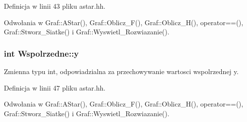 \-Definicja w linii 43 pliku astar.\-hh.



\-Odwołania w \-Graf\-::\-A\-Star(), \-Graf\-::\-Oblicz\-\_\-\-F(), \-Graf\-::\-Oblicz\-\_\-\-H(), operator==(), \-Graf\-::\-Stworz\-\_\-\-Siatke() i \-Graf\-::\-Wyswietl\-\_\-\-Rozwiazanie().

\hypertarget{struct_wspolrzedne_a0c7f103c4e9929641316706fea318d1d}{
\subsubsection[{y}]{\setlength{\rightskip}{0pt plus 5cm}int {\bf \-Wspolrzedne\-::y}}}\label{struct_wspolrzedne_a0c7f103c4e9929641316706fea318d1d}


\-Zmienna typu int, odpowiadzialna za przechowywanie wartosci wspolrzednej y. 



\-Definicja w linii 47 pliku astar.\-hh.



\-Odwołania w \-Graf\-::\-A\-Star(), \-Graf\-::\-Oblicz\-\_\-\-F(), \-Graf\-::\-Oblicz\-\_\-\-H(), operator==(), \-Graf\-::\-Stworz\-\_\-\-Siatke() i \-Graf\-::\-Wyswietl\-\_\-\-Rozwiazanie().

